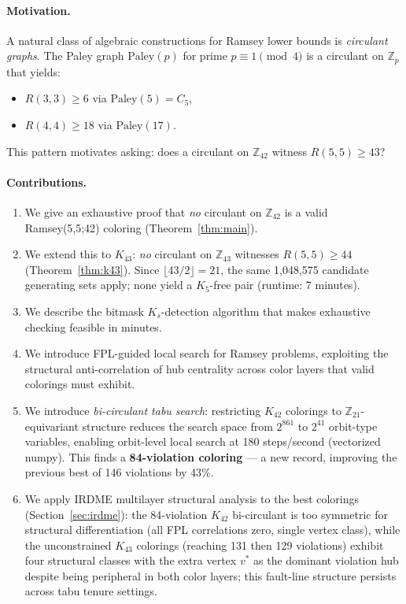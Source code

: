 \documentclass[11pt]{article}
\begin{document}
\paragraph{Motivation.}
A natural class of algebraic constructions for Ramsey lower bounds is
\emph{circulant graphs}. The Paley graph $\text{Paley}(p)$ for prime
$p \equiv 1 \pmod{4}$ is a circulant on $\mathbb{Z}_p$ that yields:
\begin{itemize}
\item $R(3,3) \geq 6$ via $\text{Paley}(5) = C_5$,
\item $R(4,4) \geq 18$ via $\text{Paley}(17)$.
\end{itemize}
This pattern motivates asking: does a circulant on $\mathbb{Z}_{42}$ witness
$R(5,5) \geq 43$?

\paragraph{Contributions.}
\begin{enumerate}
\item We give an exhaustive proof that \emph{no} circulant on $\mathbb{Z}_{42}$
is a valid Ramsey(5,5;42) coloring (Theorem~\ref{thm:main}).
\item We extend this to $K_{43}$: \emph{no} circulant on $\mathbb{Z}_{43}$
witnesses $R(5,5) \geq 44$ (Theorem~\ref{thm:k43}). Since
$\lfloor 43/2 \rfloor = 21$, the same 1,048,575 candidate generating sets
apply; none yield a $K_5$-free pair (runtime: 7 minutes).
\item We describe the bitmask $K_s$-detection algorithm that makes
exhaustive checking feasible in minutes.
\item We introduce FPL-guided local search for Ramsey problems, exploiting
the structural anti-correlation of hub centrality across color layers
that valid colorings must exhibit.
\item We introduce \emph{bi-circulant tabu search}: restricting $K_{42}$
colorings to $\mathbb{Z}_{21}$-equivariant structure reduces the search
space from $2^{861}$ to $2^{41}$ orbit-type variables,
enabling orbit-level local search at 180 steps/second (vectorized numpy).
This finds a \textbf{84-violation coloring} --- a new record, improving
the previous best of 146 violations by 43\%.
\item We apply IRDME multilayer structural analysis to the best colorings
(Section~\ref{sec:irdme}): the 84-violation $K_{42}$ bi-circulant is too
symmetric for structural differentiation (all FPL correlations zero, single
vertex class), while the unconstrained $K_{43}$ colorings (reaching 131 then 129 violations)
exhibit four structural classes with the extra vertex $v^*$ as the dominant
violation hub despite being peripheral in both color layers; this fault-line structure
persists across tabu tenure settings.
\end{enumerate}
\end{document}
